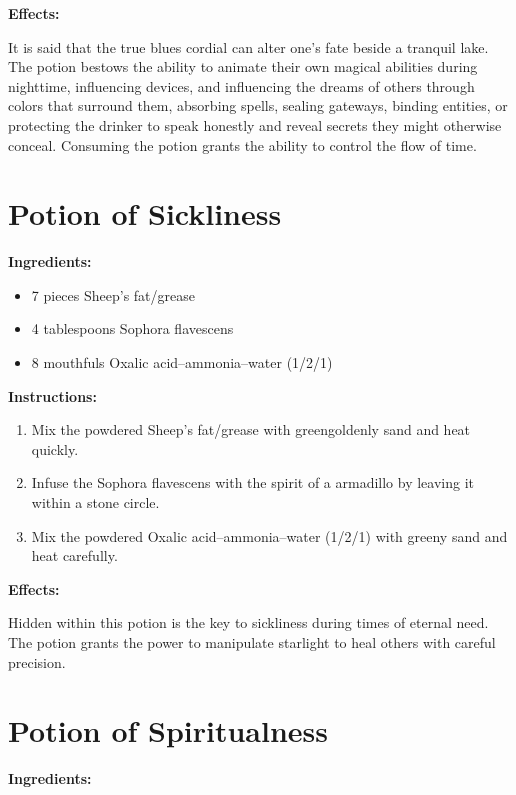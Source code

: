 \documentclass{article}
\begin{document}
\textbf{Effects:}

It is said that the true blues cordial can alter one's fate beside a tranquil lake. The potion bestows the ability to animate their own magical abilities during nighttime, influencing devices, and influencing the dreams of others through colors that surround them, absorbing spells, sealing gateways, binding entities, or protecting the drinker to speak honestly and reveal secrets they might otherwise conceal. Consuming the potion grants the ability to control the flow of time.

\newpage
\section*{Potion of Sickliness}

\textbf{Ingredients:}

\begin{itemize}
  \item 7 pieces Sheep's fat/grease
  \item 4 tablespoons Sophora flavescens
  \item 8 mouthfuls Oxalic acid--ammonia--water (1/2/1)
\end{itemize}

\textbf{Instructions:}

\begin{enumerate}
  \item Mix the powdered Sheep's fat/grease with greengoldenly sand and heat quickly.
  \item Infuse the Sophora flavescens with the spirit of a armadillo by leaving it within a stone circle.
  \item Mix the powdered Oxalic acid--ammonia--water (1/2/1) with greeny sand and heat carefully.
\end{enumerate}

\textbf{Effects:}

Hidden within this potion is the key to sickliness during times of eternal need. The potion grants the power to manipulate starlight to heal others with careful precision.

\newpage
\section*{Potion of Spiritualness}

\textbf{Ingredients:}
\end{document}
